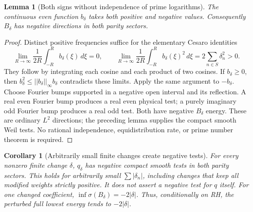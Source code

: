 \documentclass[11pt]{article}
\def\norm#1{||#1||}%
\newtheorem{lemma}[theorem]{Lemma}
\newtheorem{corollary}[theorem]{Corollary}
\theoremstyle{remark}
\newcommand{\norm}[1]{\left\lVert #1\right\rVert}
\begin{document}
\begin{lemma}[Both signs without independence of prime logarithms]\label{lem:ns57-symbol-signs}
The continuous even function $b_\delta$ takes both positive and negative
values. Consequently $B_\delta$ has negative directions in both parity sectors.
\end{lemma}
\begin{proof}
Distinct positive frequencies suffice for the elementary Cesaro identities
\[
 \lim_{R\to\infty}\frac1{2R}\int_{-R}^R b_\delta(\xi)\,d\xi=0,
 \qquad
 \lim_{R\to\infty}\frac1{2R}\int_{-R}^R b_\delta(\xi)^2\,d\xi
       =2\sum_{n\in S}\delta_n^2>0.
\]
They follow by integrating each cosine and each product of two cosines.
If $b_\delta\ge0$, then $b_\delta^2\le\norm{b_\delta}_\infty b_\delta$
contradicts these limits. Apply the same argument to $-b_\delta$.
Choose Fourier bumps supported in a negative open interval and its
reflection. A real even Fourier bump produces a real even physical
test; a purely imaginary odd Fourier bump produces a real odd test.
Both have negative $B_\delta$ energy. These are ordinary $L^2$
directions; the preceding lemma supplies the compact smooth Weil tests.
No rational independence, equidistribution rate, or prime number theorem
is required.
\end{proof}

\begin{corollary}[Arbitrarily small finite changes create negative tests]\label{cor:ns57-finite-weight-negative}
For every nonzero finite change $\delta$, $q_\delta$ has negative compact
smooth tests in both parity sectors. This holds for arbitrarily small
$\sum|\delta_n|$, including changes that keep all modified weights
strictly positive. It does not assert a negative test for $q$ itself.
For one changed coefficient, $\inf\sigma(B_\delta)=-2|\delta|$.
Thus, conditionally on RH, the perturbed full lowest energy tends
to $-2|\delta|$.
\end{corollary}
\end{document}
